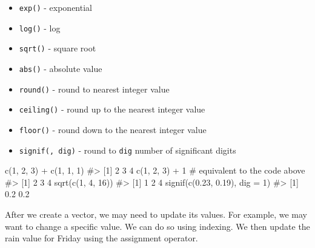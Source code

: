 \documentclass[
  letterpaper,
]{latex/krantz}
\makeatletter
\newenvironment{Shaded}{\begin{snugshade}}{\end{snugshade}}
\newcommand{\AttributeTok}[1]{\textcolor[rgb]{0.40,0.45,0.13}{#1}}
\newcommand{\CommentTok}[1]{\textcolor[rgb]{0.37,0.37,0.37}{#1}}
\newcommand{\DecValTok}[1]{\textcolor[rgb]{0.68,0.00,0.00}{#1}}
\newcommand{\FloatTok}[1]{\textcolor[rgb]{0.68,0.00,0.00}{#1}}
\newcommand{\FunctionTok}[1]{\textcolor[rgb]{0.28,0.35,0.67}{#1}}
\newcommand{\NormalTok}[1]{\textcolor[rgb]{0.00,0.23,0.31}{#1}}
\newcommand{\SpecialCharTok}[1]{\textcolor[rgb]{0.37,0.37,0.37}{#1}}
\providecommand{\tightlist}{%
  \setlength{\itemsep}{0pt}\setlength{\parskip}{0pt}}\usepackage{longtable,booktabs,array}
\newenvironment{kframe}{%
\medskip{}
\setlength{\fboxsep}{.8em}
 \def\at@end@of@kframe{}%
 \ifinner\ifhmode%
  \def\at@end@of@kframe{\end{minipage}}%
  \begin{minipage}{\columnwidth}%
 \fi\fi%
 \def\FrameCommand##1{\hskip\@totalleftmargin \hskip-\fboxsep
 \colorbox{shadecolor}{##1}\hskip-\fboxsep
     \hskip-\linewidth \hskip-\@totalleftmargin \hskip\columnwidth}%
 \MakeFramed {\advance\hsize-\width
   \@totalleftmargin\z@ \linewidth\hsize
   \@setminipage}}%
 {\par\unskip\endMakeFramed%
 \at@end@of@kframe}
\renewenvironment{Shaded}{\begin{kframe}}{\end{kframe}}
\makeatother
\begin{document}
\begin{itemize}
\tightlist
\item
  \texttt{exp()} - exponential 
\item
  \texttt{log()} - log 
\item
  \texttt{sqrt()} - square root
\item
  \texttt{abs()} - absolute value
\item
  \texttt{round()} - round to nearest integer value
\item
  \texttt{ceiling()} - round up to the nearest integer value
\item
  \texttt{floor()} - round down to the nearest integer value
\item
  \texttt{signif(,\ dig)} - round to \texttt{dig} number of significant
  digits 
\end{itemize}

\begin{Shaded}
\begin{Highlighting}[]
\FunctionTok{c}\NormalTok{(}\DecValTok{1}\NormalTok{, }\DecValTok{2}\NormalTok{, }\DecValTok{3}\NormalTok{) }\SpecialCharTok{+} \FunctionTok{c}\NormalTok{(}\DecValTok{1}\NormalTok{, }\DecValTok{1}\NormalTok{, }\DecValTok{1}\NormalTok{)}
\CommentTok{\#\textgreater{} [1] 2 3 4}
\FunctionTok{c}\NormalTok{(}\DecValTok{1}\NormalTok{, }\DecValTok{2}\NormalTok{, }\DecValTok{3}\NormalTok{) }\SpecialCharTok{+} \DecValTok{1} \CommentTok{\# equivalent to the code above}
\CommentTok{\#\textgreater{} [1] 2 3 4}
\FunctionTok{sqrt}\NormalTok{(}\FunctionTok{c}\NormalTok{(}\DecValTok{1}\NormalTok{, }\DecValTok{4}\NormalTok{, }\DecValTok{16}\NormalTok{))}
\CommentTok{\#\textgreater{} [1] 1 2 4}
\FunctionTok{signif}\NormalTok{(}\FunctionTok{c}\NormalTok{(}\FloatTok{0.23}\NormalTok{, }\FloatTok{0.19}\NormalTok{), }\AttributeTok{dig =} \DecValTok{1}\NormalTok{)}
\CommentTok{\#\textgreater{} [1] 0.2 0.2}
\end{Highlighting}
\end{Shaded}

After we create a vector, we may need to update its values. For example,
we may want to change a specific value. We can do so using indexing. We
then update the rain value for Friday using the assignment operator.
\end{document}
